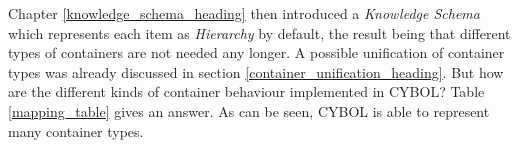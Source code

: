 Chapter \ref{knowledge_schema_heading} then introduced a \emph{Knowledge Schema}
which represents each item as \emph{Hierarchy} by default, the result being
that different types of containers are not needed any longer. A possible
unification of container types was already discussed in section
\ref{container_unification_heading}. But how are the different kinds of
container behaviour implemented in CYBOL? Table \ref{mapping_table} gives an
answer. As can be seen, CYBOL is able to represent many container types.
